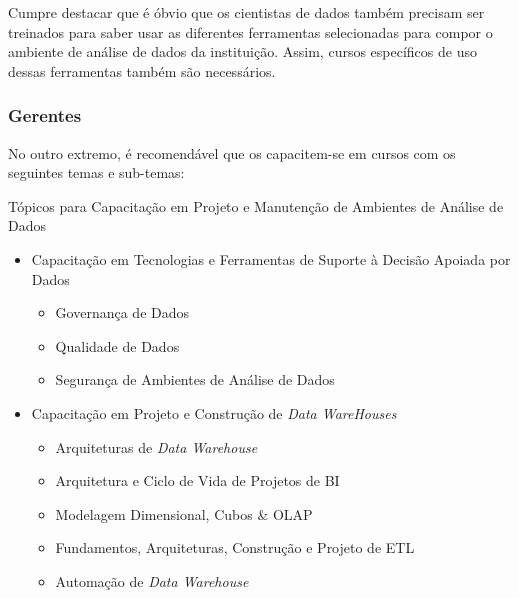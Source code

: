     Cumpre destacar que é óbvio que os cientistas de dados também precisam ser treinados para saber usar as diferentes ferramentas selecionadas para compor o ambiente de análise de dados da instituição. Assim, cursos específicos de uso dessas ferramentas também são necessários. 
    
    \newpage
    
    \subsubsection*{Gerentes}
    
    No outro extremo, é recomendável que os \GERENTES \xspace capacitem-se em cursos com os seguintes temas e sub-temas:   
    
    \begin{env-destaque}{Tópicos para Capacitação em Projeto e Manutenção de Ambientes de Análise de Dados}
        \begin{itemize}
            \item Capacitação em Tecnologias e Ferramentas de Suporte à Decisão Apoiada por Dados
                \begin{itemize}
                    \item Governança de Dados
                    \item Qualidade de Dados
                    \item Segurança de Ambientes de Análise de Dados
                \end{itemize}        

            \item Capacitação em Projeto e Construção de \emph{Data WareHouses}
                \begin{itemize}
                    \item Arquiteturas de \emph{Data Warehouse}
                    \item Arquitetura e Ciclo de Vida de Projetos de BI
                    \item Modelagem Dimensional, Cubos \& OLAP
                    \item Fundamentos, Arquiteturas, Construção e Projeto de ETL
                    \item Automação de \emph{Data Warehouse}
                \end{itemize}
            

\end{itemize}
\end{env-destaque}
